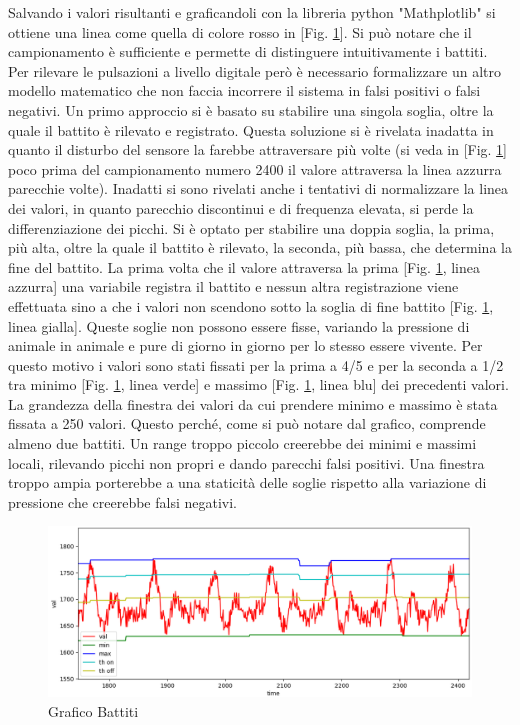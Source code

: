 Salvando i valori risultanti e graficandoli con la libreria python "Mathplotlib" si ottiene una linea come quella di colore rosso in [Fig. \ref{fig:Heartbeat}]. Si può notare che il campionamento è sufficiente e permette di distinguere intuitivamente i battiti. 
Per rilevare le pulsazioni a livello digitale però è necessario formalizzare un altro modello matematico che non faccia incorrere il sistema in falsi positivi o falsi negativi. Un primo approccio si è basato su stabilire una singola soglia, oltre la quale il battito è rilevato e registrato. Questa soluzione si è rivelata inadatta in quanto il disturbo del sensore la farebbe attraversare più volte (si veda in [Fig. \ref{fig:Heartbeat}] poco prima del campionamento numero 2400 il valore attraversa la linea azzurra parecchie volte). Inadatti si sono rivelati anche i tentativi di normalizzare la linea dei valori, in quanto parecchio discontinui e di frequenza elevata, si perde la differenziazione dei picchi. Si è optato per stabilire una doppia soglia, la prima, più alta, oltre la quale il battito è rilevato, la seconda, più bassa, che determina la fine del battito. La prima volta che il valore attraversa la prima [Fig. \ref{fig:Heartbeat}, linea azzurra] una variabile registra il battito e nessun altra registrazione viene effettuata sino a che i valori non scendono sotto la soglia di fine battito [Fig. \ref{fig:Heartbeat}, linea gialla]. 
Queste soglie non possono essere fisse, variando la pressione di animale in animale e pure di giorno in giorno per lo stesso essere vivente. Per questo motivo i valori sono stati fissati per la prima a 4/5 e per la seconda a 1/2 tra minimo [Fig. \ref{fig:Heartbeat}, linea verde] e massimo [Fig. \ref{fig:Heartbeat}, linea blu] dei precedenti valori. La grandezza della finestra dei valori da cui prendere minimo  e massimo è stata fissata a 250 valori. Questo perché, come si può notare dal grafico, comprende almeno due battiti. Un range troppo piccolo creerebbe dei minimi e massimi locali, rilevando picchi non propri e dando parecchi falsi positivi. Una finestra troppo ampia porterebbe a una staticità delle soglie rispetto alla variazione di pressione che creerebbe falsi negativi.  

    \begin{figure}[H]
        \caption{Grafico Battiti}
        \label{fig:Heartbeat}
        \centering
        \includegraphics[width=1\textwidth]{Images/heartbeatGraph.png}
    \end{figure}

